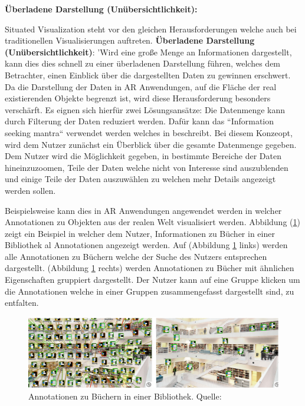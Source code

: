 \textbf{Überladene Darstellung (Unübersichtlichkeit):}

 Situated Visualization steht vor den gleichen Herausforderungen welche auch bei traditionellen Visualisierungen auftreten. 
\textbf{Überladene Darstellung (Unübersichtlichkeit)}: 'Wird eine große Menge an Informationen dargestellt, kann dies dies schnell zu einer überladenen Darstellung führen, welches dem Betrachter, einen Einblick 
über die dargestellten Daten zu gewinnen erschwert. Da die Darstellung der Daten in AR Anwendungen, auf die Fläche der real existierenden Objekte begrenzt ist, 
wird diese Herausforderung besonders verschärft. Es eignen sich hierfür zwei Lösungsansätze: Die Datenmenge kann durch Filterung der Daten reduziert werden. 
Dafür kann das ``Information seeking mantra`` verwendet werden welches \citeauthor{Shneiderman1996} in \cite{Shneiderman1996} beschreibt. \cite[S.~241]{DieterSchmalstieg2016}
Bei diesem Konzeopt, wird dem Nutzer zunächst ein Überblick über die gesamte Datenmenge gegeben. Dem Nutzer wird die Möglichkeit gegeben, in bestimmte Bereiche der Daten hineinzuzoomen, Teile der Daten 
welche nicht von Interesse sind auszublenden und einige Teile der Daten auszuwählen zu welchen mehr Details angezeigt werden sollen. 

Beispielsweise kann dies in AR Anwendungen angewendet werden in welcher Annotationen zu Objekten aus der realen Welt visualisiert werden. 
Abbildung (\ref{img:annotation_clutter}) zeigt ein Beispiel in welcher dem Nutzer, Informationen zu Bücher in einer Bibliothek al Annotationen angezeigt werden. Auf (Abbildung \ref{img:annotation_clutter} links) werden 
alle Annotationen zu Büchern welche der Suche des Nutzers entsprechen dargestellt. (Abbildung \ref{img:annotation_clutter} rechts) werden Annotationen zu Bücher mit ähnlichen Eigenschaften gruppiert dargestellt. 
Der Nutzer kann auf eine Gruppe klicken um die Annotationen welche in einer Gruppen zusammengefasst dargestellt sind, zu entfalten. 

\begin{figure}[H]
	\centering
	\includegraphics[width=1.0\textwidth]{resources/fundamentals/annotations_clutter.png}
	\caption{Annotationen zu Büchern in einer Bibliothek. Quelle: \cite[S.~1]{Tatzgern2016}}
	\label{img:annotation_clutter}
\end{figure}

